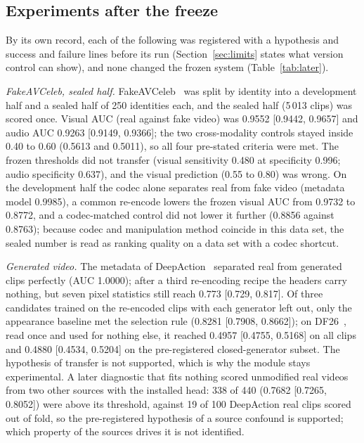 \documentclass[conference,a4paper]{IEEEtran_nodash}
\begin{document}
\subsection{Experiments after the freeze}\label{sec:later}
By its own record, each of the following was registered with a hypothesis and
success and failure lines before its run (Section~\ref{sec:limits} states what
version control can show), and none changed the frozen system
(Table~\ref{tab:later}). %

\emph{FakeAVCeleb, sealed half.} FakeAVCeleb~\cite{khalid2022fakeavceleb} was split
by identity into a development half and a sealed half of 250 identities each, and
the sealed half (5\,013 clips) was scored once. Visual AUC (real against fake
video) was 0.9552 [0.9442, 0.9657] and audio AUC 0.9263 [0.9149, 0.9366]; the two
cross-modality controls stayed inside 0.40 to 0.60 (0.5613 and 0.5011), so all
four pre-stated criteria were met. The frozen thresholds did not transfer
(visual sensitivity 0.480 at specificity 0.996; audio specificity 0.637), and
the visual prediction (0.55 to 0.80) was wrong. On the development half the
codec alone separates real from fake video (metadata model 0.9985), a common
re-encode lowers the frozen visual AUC from 0.9732 to 0.8772, and a
codec-matched control did not lower it further (0.8856 against 0.8763); because
codec and manipulation method coincide in this data set, the sealed number is
read as ranking quality on a data set with a codec shortcut. %

\emph{Generated video.} The metadata of DeepAction~\cite{bohacek2025deepaction}
separated real from generated clips perfectly (AUC 1.0000); after a third
re-encoding recipe the headers carry nothing, but seven pixel statistics still
reach 0.773 [0.729, 0.817]. Of three candidates trained on the re-encoded clips
with each generator left out, only the appearance baseline met the selection
rule (0.8281 [0.7908, 0.8662]); on DF26~\cite{shykula2026df26}, read once and used
for nothing else, it reached 0.4957 [0.4755, 0.5168] on all clips and 0.4880
[0.4534, 0.5204] on the pre-registered closed-generator subset. The hypothesis
of transfer is not supported, which is why the module stays experimental. A
later diagnostic that fits nothing scored unmodified real videos from two other
sources with the installed head: 338 of 440 (0.7682 [0.7265, 0.8052]) were above
its threshold, against 19 of 100 DeepAction real clips scored out of fold, so the
pre-registered hypothesis of a source confound is supported; which property of
the sources drives it is not identified. %
\end{document}
